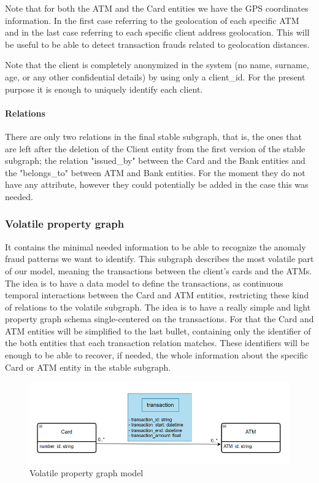 \documentclass{article}
\begin{document}
Note that for both the ATM and the Card entities we have the GPS coordinates information. In the first case referring to the geolocation of each specific ATM and in the last case referring to each specific client address geolocation. This will be useful to be able to detect transaction frauds related to geolocation distances.

Note that the client is completely anonymized in the system (no name, surname, age, or any other confidential details) by using only a client\_id. For the present purpose it is enough to uniquely identify each client.

\paragraph{Relations}
There are only two relations in the final stable subgraph, that is, the ones that are left after the deletion of the Client entity from the first version of the stable subgraph; the relation "issued\_by" between the Card and the Bank entities and the "belongs\_to" between ATM and Bank entities. For the moment they do not have any attribute, however they could potentially be added in the case this was needed.

\subsubsection{Volatile property graph}

It contains the minimal needed information to be able to recognize the anomaly fraud patterns we want to identify.
This subgraph describes the most volatile part of our model, meaning the transactions between the client's cards and the ATMs. The idea is to have a data model to define the transactions, as continuous temporal interactions between the Card and ATM entities, restricting these kind of relations to the volatile subgraph.
The idea is to have a really simple and light property graph schema single-centered on the transactions. For that the Card and ATM entities will be simplified to the last bullet, containing only the identifier of the both entities that each transaction relation matches. These identifiers will be enough to be able to recover, if needed, the whole information about the specific Card or ATM entity in the stable subgraph.

\begin{figure}[H]
    \centering
    \includegraphics[scale = 0.45]{images/diagPG-volatile.png}
    \caption{Volatile property graph model}
    \label{img:pg-stable}
\end{figure}
\end{document}
